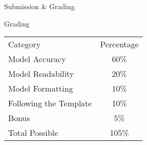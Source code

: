 \documentclass[]{article}
\begin{document}
\begin{section}{Submission \& Grading}
\begin{subsection}{Grading}
\begin{center}
\begin{tabular}{l|c}
\toprule
Category & Percentage\\

\cmidrule(lr){1-2}
Model Accuracy & 60\%\\
Model Readability & 20\%\\
Model Formatting & 10\%\\
Following the Template & 10\%\\
Bonus & 5\%\\

\midrule
Total Possible & 105\%\\

\bottomrule
\end{tabular}
\end{center}
\end{subsection}
\end{section}
\end{document}
